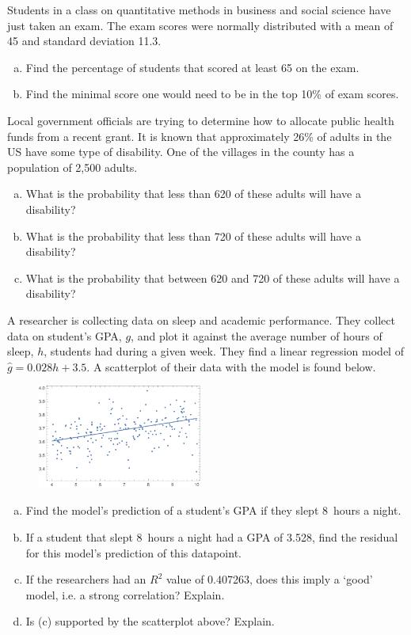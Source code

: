 \documentclass[12pt,letterpaper]{exam}
\begin{document}
\begin{questions}
\newpage
\question[10] Students in a class on quantitative methods in business and social science have just taken an exam. The exam scores were normally distributed with a mean of 45 and standard deviation 11.3. 
	\begin{enumerate}[(a)]
	\item Find the percentage of students that scored at least 65 on the exam. 
	\item Find the minimal score one would need to be in the top 10\% of exam scores. 
	\end{enumerate}



\newpage
\question[10] Local government officials are trying to determine how to allocate public health funds from a recent grant. It is known that approximately 26\% of adults in the US have some type of disability. One of the villages in the county has a population of 2,500 adults.
	\begin{enumerate}[(a)]
	\item What is the probability that less than 620 of these adults will have a disability?
	\item What is the probability that less than 720 of these adults will have a disability?
	\item What is the probability that between 620 and 720 of these adults will have a disability?
	\end{enumerate}



\newpage
\question[10] A researcher is collecting data on sleep and academic performance. They collect data on student's GPA, $g$, and plot it against the average number of hours of sleep, $h$, students had during a given week. They find a linear regression model of $\widehat{g}= 0.028h + 3.5$. A scatterplot of their data with the model is found below.
	\begin{figure}[!ht]
	\centering
	\includegraphics[width=0.48\textwidth]{regplot.png}
	\end{figure}

\begin{enumerate}[(a)]
\item Find the model's prediction of a student's GPA if they slept 8~hours a night.
\item If a student that slept 8~hours a night had a GPA of 3.528, find the residual for this model's prediction of this datapoint. 
\item If the researchers had an $R^2$ value of 0.407263, does this imply a `good' model, i.e. a strong correlation? Explain.
\item Is (c) supported by the scatterplot above? Explain.
\end{enumerate}




\end{questions}
\end{document}
